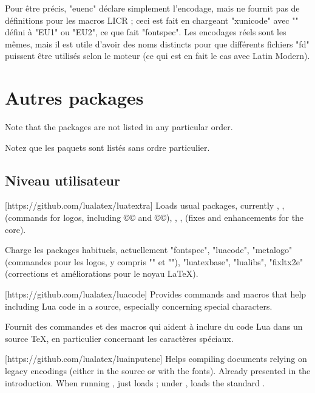 \documentclass{lltxdoc}
\begin{document}
Pour être précis, "euenc" déclare simplement l'encodage, mais ne fournit pas de définitions pour les macros LICR ; ceci est fait en chargeant "xunicode" avec "\UTFencname" défini à "EU1" ou "EU2", ce que fait "fontspec". Les encodages réels sont les mêmes, mais il est utile d'avoir des noms distincts pour que différents fichiers "fd" puissent être utilisés selon le moteur (ce qui est en fait le cas avec Latin Modern).

\section{Autres packages}\label{other}

Note that the packages are not listed in any particular order.

Notez que les paquets sont listés sans ordre particulier.

\subsection{Niveau utilisateur}

[https://github.com/lualatex/luatextra]
Loads usual packages, currently , , 
(commands for logos, including ©\LuaTeX© and ©\LuaLaTeX©), ,
,  (fixes and enhancements for the \latex core).

Charge les packages habituels, actuellement "fontspec", "luacode", "metalogo" (commandes pour les logos, y compris "\LuaTeX" et "\LuaLaTeX"), "luatexbase", "lualibs", "fixltx2e" (corrections et améliorations pour le noyau LaTeX).

[https://github.com/lualatex/luacode]
Provides commands and macros that help including Lua code in a \tex source,
especially concerning special characters.

Fournit des commandes et des macros qui aident à inclure du code Lua dans un source TeX, en particulier concernant les caractères spéciaux.

[https://github.com/lualatex/luainputenc]
Helps compiling documents relying on legacy encodings (either in the source or
with the fonts). Already presented in the introduction. When running \xetex,
just loads ; under \pdftex, loads the standard
.
\end{document}
